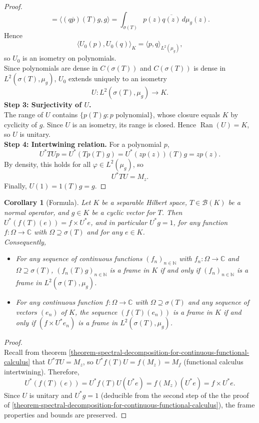 \documentclass[a4paper,11pt]{article}
\theoremstyle{plain}
\newtheorem{corollary}[theorem]{Corollary}
\theoremstyle{definition}
\theoremstyle{remark}
\begin{document}
\begin{proof}
\[= \langle (q\overline{p})(T)g, g\rangle
= \int_{\sigma(T)} p(z)\overline{q(z)}\, d\mu_g(z).
\]
Hence
\[
\langle U_0(p), U_0(q)\rangle_K
= \langle p, q\rangle_{L^2(\mu_g)},
\]
so $U_0$ is an isometry on polynomials. \\
Since polynomials are dense in $C(\sigma(T))$ and $C(\sigma(T))$ is dense in $L^2(\sigma(T),\mu_g)$, $U_0$ extends uniquely to an isometry
\[
U : L^2(\sigma(T),\mu_g) \to K.
\]
\textbf{Step 3: Surjectivity of $U$.} \\
The range of $U$ contains $\{p(T)g : p \text{ polynomial}\}$, whose closure equals $K$ by cyclicity of $g$. Since $U$ is an isometry, its range is closed. Hence $\operatorname{Ran}(U) = K$, so $U$ is unitary. \\
\textbf{Step 4: Intertwining relation.}
For a polynomial $p$,
\[
U^* T U p = U^* (T p(T)g) = U^*(z p(z))(T)g = z p(z).
\]
By density, this holds for all $\varphi \in L^2(\mu_g)$, so
\[
U^* T U = M_z.
\]
Finally, $U(1) = 1(T)g = g$.
\end{proof}


\begin{corollary}[Formula]
\label{corollary-image-under-U*-of-Tng-and-f(T)en}
Let $K$ be a separable Hilbert space, $T \in \mathcal{B}(K)$ be a normal operator, and $g \in K$ be a cyclic vector for $T$. Then $U^*(f(T)(e)) =  f \times U^* e$, and in particular $U^* g = 1$, for any function $f : \Omega \to \mathbb{C}$ with $\Omega \supseteq \sigma(T)$ and for any $e \in K$. \\
Consequently,
\begin{itemize}
\item For any sequence of continuous functions $(f_n)_{n \in \mathbb{N}}$ with $f_n : \Omega \to \mathbb{C}$ and $\Omega \supseteq \sigma(T)$, $(f_n(T)g)_{n \in \mathbb{N}}$ is a frame in $K$ if and only if $(f_n)_{n \in \mathbb{N}}$ is a frame in $L^2(\sigma(T), \mu_g)$.
\item For any continuous function $f: \Omega \to \mathbb{C}$ with $\Omega \supseteq \sigma(T)$ and any sequence of vectors $(e_n)$ of $K$, the sequence $(f(T)(e_n))$ is a frame in $K$ if and only if  $(f \times U^* e_n)$ is a frame in $L^2(\sigma(T),\mu_g)$.
\end{itemize}
\end{corollary}

\begin{proof}
\mbox{} \\
Recall from theorem \ref{theorem-spectral-decomposition-for-continuous-functional-calculus} that \(U^* T U = M_z \), so \(U^* f(T) U = f(M_z) = M_f\) (functional calculus intertwining). Therefore,
\[U^*(f(T)(e)) = U^* f(T) U (U^* e) = f(M_z)(U^* e) = f \times U^* e.\]
Since $U$ is unitary and \(U^* g = 1\) (deducible from the second step of the the proof of \ref{theorem-spectral-decomposition-for-continuous-functional-calculus}), the frame properties and bounds are preserved.
\end{proof}
\end{document}
